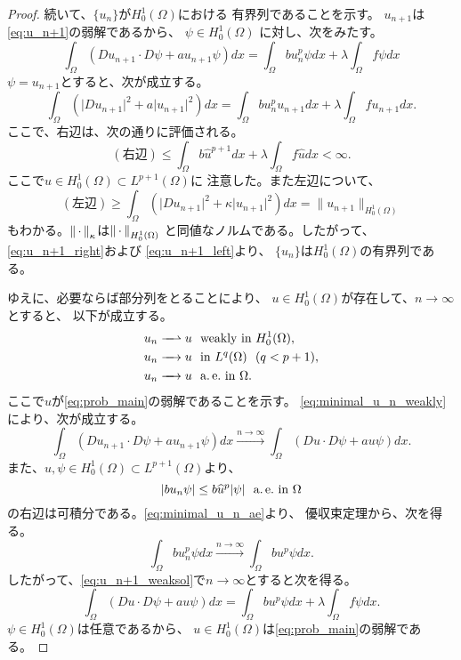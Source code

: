 \begin{proof}
 続いて、$\{u_n\}$が$H_0^1(\Omega)$における
 有界列であることを示す。
 $u_{n+1}$は\eqref{eq:u_n+1}の弱解であるから、
 $\psi \in H_0^1(\Omega)$
 に対し、次をみたす。
 \begin{equation}
  \int_\Omega (Du_{n+1} \cdot D\psi + a u_{n+1} \psi) dx 
   = \int_\Omega bu_n^p \psi dx + \lambda \int_\Omega f\psi dx
   \label{eq:u_n+1_weaksol}
 \end{equation}
 $\psi = u_{n+1}$とすると、次が成立する。
 \[
 \int_\Omega (\lvert Du_{n+1} \rvert^2 
 + a \lvert u_{n+1} \rvert^2) dx 
 = \int_\Omega bu_n^p u_{n+1} dx 
 + \lambda \int_\Omega f u_{n+1} dx.
 \]
 ここで、右辺は、次の通りに評価される。
 \begin{equation}
  (\text{右辺}) \leq \int_\Omega b\hat{u}^{p+1} dx + \lambda
   \int_\Omega f \hat{u} dx < \infty. \label{eq:u_n+1_right}
 \end{equation}
 ここで$\hat{u} \in H_0^1(\Omega) \subset L^{p+1}(\Omega)$に
 注意した。また左辺について、
 \begin{equation}
  (\text{左辺}) \geq \int_\Omega \left( \lvert Du_{n+1} \rvert^2 + \kappa
   \lvert u_{n+1} \rvert^2 \right) dx = \| u_{n+1} \|_{H_0^1(\Omega)}
  \label{eq:u_n+1_left}
 \end{equation}
 もわかる。$\left\|\, \cdot \, \right\|_\kappa$は$\left\|\, \cdot \, \right\|_{H_0^1(\Omega)}$
 と同値なノルムである。したがって、\eqref{eq:u_n+1_right}および
 \eqref{eq:u_n+1_left}より、
 $\{u_n\}$は$H_0^1(\Omega)$の有界列である。

 ゆえに、必要ならば部分列をとることにより、
 $u \in H_0^1(\Omega)$が存在して、$n \to \infty$とすると、
 以下が成立する。
 \begin{align}
  u_n \xrightharpoonup{ \mbox{ ~ } } u & \ \ \text{weakly~} \tin
  H_0^1(\Omega), \label{eq:minimal_u_n_weakly} \\
  u_n \xrightarrow{ \mbox{ ~ } } u & \ \ \tin L^q(\Omega) \notag \ \
   (q < p+1), \\
  u_n \xrightarrow{ \mbox{ ~ } } u & \ \ \ae \tin \Omega. 
    \label{eq:minimal_u_n_ae}
 \end{align}
 ここで$u$が\ref{eq:prob_main}の弱解であることを示す。
 \eqref{eq:minimal_u_n_weakly}により、次が成立する。
 \[
 \int_\Omega (Du_{n+1} \cdot D\psi + a u_{n+1} \psi) dx
 \xrightarrow{n \to \infty}
 \int_\Omega (Du \cdot D\psi + a u \psi) dx.
 \]
 また、$\hat{u}, \psi \in H_0^1(\Omega) \subset L^{p+1}(\Omega)$より、
 \[
  \left\lvert bu_n \psi \right\rvert \leq b \widehat{u}^p \lvert\psi\rvert \ \ \text{a.\,e.}~
 \text{in}~ \Omega
 \]
 の右辺は可積分である。\eqref{eq:minimal_u_n_ae}より、
 優収束定理から、次を得る。
 \[
 \int_\Omega bu_n^p \psi dx \xrightarrow{n \to \infty} 
 \int_\Omega bu^p \psi dx.
 \]
 したがって、\eqref{eq:u_n+1_weaksol}で$n \to \infty$とすると次を得る。
 \begin{equation}
  \int_\Omega (Du \cdot D\psi + a u \psi) dx 
   = \int_\Omega bu^p \psi dx + \lambda \int_\Omega f\psi dx.
   \label{eq:minimal_u_weaksol}
 \end{equation}
 $\psi \in H_0^1(\Omega)$は任意であるから、
 $u \in H_0^1(\Omega)$は\ref{eq:prob_main}の弱解である。
 

\end{proof}
